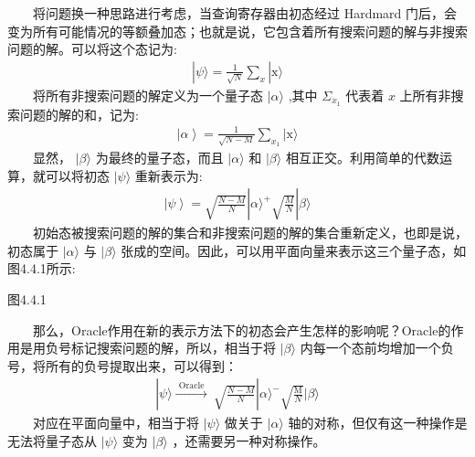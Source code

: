 \documentclass[a4paper,11pt,english]{sphinxmanual}
\begin{document}
\sphinxAtStartPar
  将问题换一种思路进行考虑，当查询寄存器由初态经过 Hardmard 门后，会变为所有可能情况的等额叠加态；也就是说，它包含着所有搜索问题的解与非搜索问题的解。可以将这个态记为:
\begin{equation*}
\begin{split}|\psi\rangle=\frac{1}{\sqrt{N}} \sum_{x}|\mathrm{x}\rangle\end{split}
\end{equation*}
\sphinxAtStartPar
  将所有非搜索问题的解定义为一个量子态  \(|\alpha\rangle\) ,其中 \(\Sigma_{x_{1}}\) 代表着  \(x\) 上所有非搜索问题的解的和，记为:
\begin{equation*}
\begin{split}\left.\left.\right| \alpha\right\rangle=\frac{1}{\sqrt{N-M}} \sum_{x_1}|\mathrm{x}\rangle\end{split}
\end{equation*}
\sphinxAtStartPar
  显然， \(|\beta\rangle\) 为最终的量子态，而且  \(|\alpha\rangle\) 和  \(|\beta\rangle\) 相互正交。利用简单的代数运算，就可以将初态  \(|\psi\rangle\) 重新表示为:
\begin{equation*}
\begin{split}\left.\left.\right| \psi \right\rangle=\sqrt{\frac{N-M}{N}}|\alpha\rangle^{+} \sqrt{\frac{M}{N}}|\beta\rangle\end{split}
\end{equation*}
\sphinxAtStartPar
  初始态被搜索问题的解的集合和非搜索问题的解的集合重新定义，也即是说，初态属于  \(|\alpha\rangle\) 与  \(|\beta\rangle\) 张成的空间。因此，可以用平面向量来表示这三个量子态，如图4.4.1所示:


\begin{center}图4.4.1
\end{center}
\sphinxAtStartPar
  那么，Oracle作用在新的表示方法下的初态会产生怎样的影响呢？Oracle的作用是用负号标记搜索问题的解，所以，相当于将  \(|\beta\rangle\) 内每一个态前均增加一个负号，将所有的负号提取出来，可以得到：
\begin{equation*}
\begin{split}|\psi\rangle\stackrel{\text { Oracle }}{\longrightarrow} \ \sqrt{\frac{N-M}{N}}|\alpha\rangle^{-} \sqrt{\frac{\mathrm{M}}{N}}|\beta\rangle\end{split}
\end{equation*}
\sphinxAtStartPar
  对应在平面向量中，相当于将  \(|\psi\rangle\) 做关于  \(|\alpha\rangle\) 轴的对称，但仅有这一种操作是无法将量子态从  \(|\psi\rangle\) 变为 \(|\beta\rangle\) ，还需要另一种对称操作。
\end{document}
